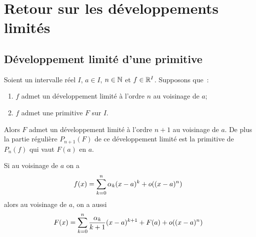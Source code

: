 \section{Retour sur les développements limités}

\subsection{Développement limité d'une primitive}

\begin{theo}
  Soient un intervalle réel \(I\), \(a \in I\), \(n \in \mathbb{N}\) et \(f \in \mathbb{R}^I\).
  Supposons que~:
  \begin{enumerate}
    \item \(f\) admet un développement limité à l'ordre \(n\) au voisinage de
      \(a\);
    \item \(f\) admet une primitive \(F\) sur \(I\).
  \end{enumerate}
  Alors \(F\) admet un développement limité à l'ordre \(n+1\) au voisinage de
  \(a\). De plus la partie régulière \(P_{n+1}(F)\) de ce développement limité
  est la primitive de \(P_n(f)\) qui vaut \(F(a)\) en \(a\).

  Si au voisinage de \(a\) on a
  \begin{equation}
    f(x) = \sum_{k = 0}^n \alpha_k(x-a)^k +o\mathopen{}\left((x-a)^n\right)
  \end{equation}
  alors au voisinage de \(a\), on a aussi
  \begin{equation}
    F(x) = \sum_{k = 0}^n \frac{\alpha_k}{k+1}(x-a)^{k+1} +F(a) + o\mathopen{}\left((x-a)^n\right)
  \end{equation}
\end{theo}
